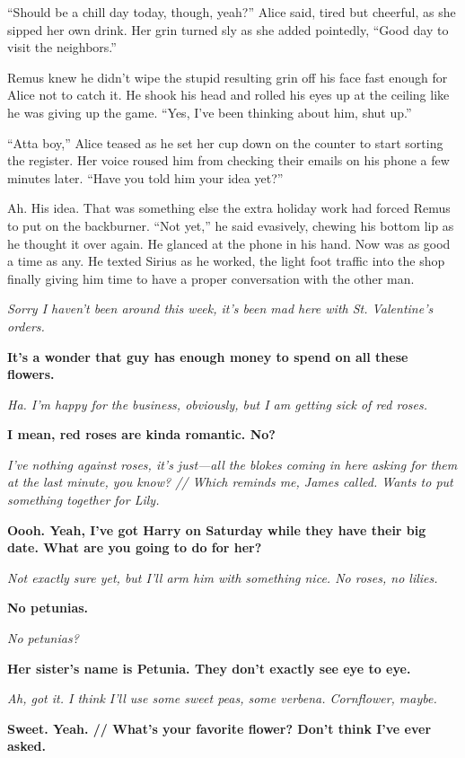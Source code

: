 “Should be a chill day today, though, yeah?” Alice said, tired but cheerful, as she sipped her own drink. Her grin turned sly as she added pointedly, “Good day to visit the neighbors.”

Remus knew he didn’t wipe the stupid resulting grin off his face fast enough for Alice not to catch it. He shook his head and rolled his eyes up at the ceiling like he was giving up the game. “Yes, I’ve been thinking about him, shut up.”

“Atta boy,” Alice teased as he set her cup down on the counter to start sorting the register. Her voice roused him from checking their emails on his phone a few minutes later. “Have you told him your idea yet?”

Ah. His idea. That was something else the extra holiday work had forced Remus to put on the backburner. “Not yet,” he said evasively, chewing his bottom lip as he thought it over again. He glanced at the phone in his hand. Now was as good a time as any. He texted Sirius as he worked, the light foot traffic into the shop finally giving him time to have a proper conversation with the other man.

\textit{Sorry I haven’t been around this week, it’s been mad here with St. Valentine’s orders.
}

\textbf{It’s a wonder that guy has enough money to spend on all these flowers.
}

\textit{Ha. I’m happy for the business, obviously, but I am getting sick of red roses.
}

\textbf{I mean, red roses are kinda romantic. No?
}

\textit{I’ve nothing against roses, it’s just—all the blokes coming in here asking for them at the last minute, you know? // Which reminds me, James called. Wants to put something together for Lily.
}

\textbf{Oooh. Yeah, I’ve got Harry on Saturday while they have their big date. What are you going to do for her?
}

\textit{Not exactly sure yet, but I’ll arm him with something nice. No roses, no lilies.
}

\textbf{No petunias.
}

\textit{No petunias?
}

\textbf{Her sister’s name is Petunia. They don’t exactly see eye to eye.
}

\textit{Ah, got it. I think I’ll use some sweet peas, some verbena. Cornflower, maybe.
}

\textbf{Sweet. Yeah. // What’s your favorite flower? Don’t think I’ve ever asked.
}

